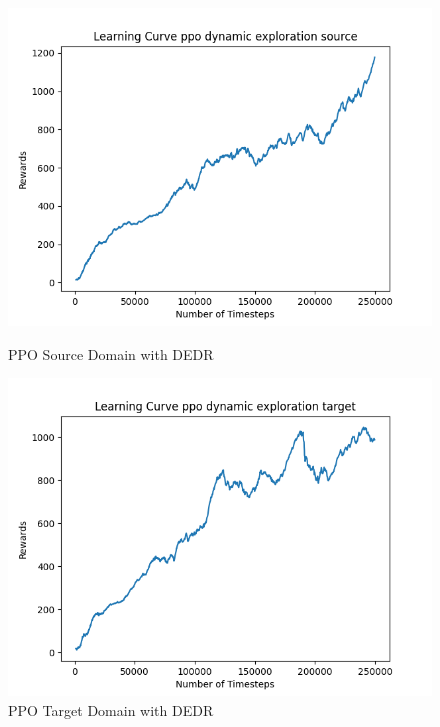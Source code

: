 \documentclass[11pt]{article}
\begin{document}
\begin{figure}[H]
    \begin{minipage}{0.45\textwidth}
        \centering
        \includegraphics[width=\textwidth]{../images/Learning_Curve_PPO_DE_Source.png}
        \caption{PPO Source Domain with DEDR}
        \label{fig:ppo_source_dedr}
    \end{minipage}
    \hfill
    \begin{minipage}{0.45\textwidth}
        \centering
        \includegraphics[width=\textwidth]{../images/Learning_Curve_PPO_DE_Target.png}
        \caption{PPO Target Domain with DEDR}
        \label{fig:ppo_target_dedr}
    \end{minipage}
\end{figure}
\end{document}
